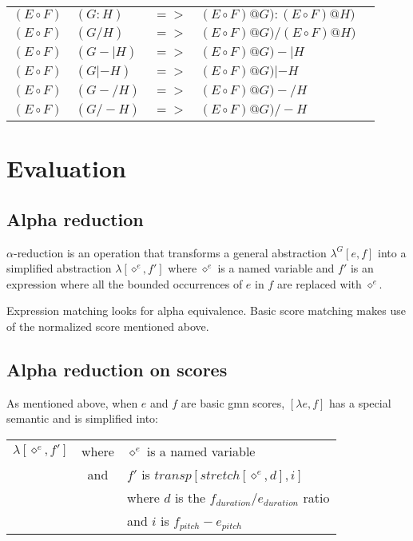 \documentclass[10pt,a4paper,frenchb]{article}
\newcommand{\seq}{:}
\newcommand{\var}[1]{\diamond^#1}
\begin{document}
\begin{table}[H]
\begin{center}
\begin{tabular}{r@{@}lcll}
 \hline
 $ (E \circ F)$ & $(G \seq H)$ & $=>$ & $(E \circ F) @ G) \seq (E \circ F) @ H)$ & \\
 $ (E \circ F)$ & $(G / H)$ & $=>$ & $(E \circ F) @ G) / (E \circ F) @ H)$ & \\ 
 $ (E \circ F)$ & $(G -| H)$ & $=>$ & $(E \circ F) @ G) -| H$ & \\
 $ (E \circ F)$ & $(G |- H)$ & $=>$ & $(E \circ F) @ G) |- H$ & \\ 
 $ (E \circ F)$ & $(G -/ H)$ & $=>$ & $(E \circ F) @ G) -/ H$ & \\
 $ (E \circ F)$ & $(G /- H)$ & $=>$ & $(E \circ F) @ G) /- H$ & 
\\

\end{tabular}
\end{center}
\end{table}


\section{Evaluation}

\subsection{Alpha reduction}

$\alpha$-reduction is an operation that transforms a general abstraction $\lambda^G[e,f]$ into a simplified abstraction $\lambda[\var{e},f']$ where $\var{e}$ is a named variable and $f'$ is an expression where all the bounded occurrences of $e$ in $f$ are replaced with $\var{e}$.

Expression matching looks for alpha equivalence. Basic score matching makes use of the normalized score mentioned above. 

\subsection{Alpha reduction on scores}

As mentioned above, when $e$ and $f$ are basic gmn scores, $[\lambda e,f]$ has a special semantic and is simplified into: 
\begin{tabular}{rcl}
 $\lambda[\var{e},f']$ & where & $\var{e}$ is a named variable \\
 	& and & $f'$ is $transp[stretch[\var{e}, d], i]$ \\
 	&  & where $d$ is the $f_{duration} / e_{duration}$ ratio \\
 	&  & and $i$ is $f_{pitch} - e_{pitch}$ \\
\end{tabular}
\end{document}
